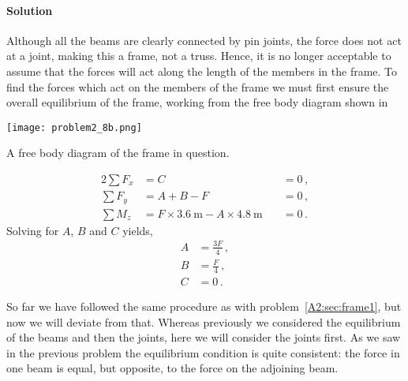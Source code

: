 \documentclass[a4paper,justified,oneside]{tufte-handout}
\numberwithin{equation}{subsection}
\begin{document}
\begin{solution}
\paragraph{Solution}
Although all the beams are clearly connected by pin joints, the force does not act at a joint, making this a frame, not a truss. Hence, it is no longer acceptable to assume that the forces will act along the length of the members in the frame. To find the forces which act on the members of the frame we must first ensure the overall equilibrium of the frame, working from the free body diagram shown in 
\begin{marginfigure}
	\centering
	\texttt{[image: problem2\_8b.png]}
	\caption{A free body diagram of the frame in question.}
	\label{A3:fig:Q8b}
\end{marginfigure}
\begin{alignat*}{2}
	\sum F_x	&=	C	&\quad=	0\,,	\\
	\sum F_y	&=	A +B -F	&\quad=	0\,,	\\
	\sum M_z		&=	F \times \SI{3.6}{\m}	-A\times \SI{4.8}{\m}	&\quad=	0\,.
\end{alignat*}
Solving for $A$, $B$ and $C$ yields,
\begin{align*}
A	&=	\frac{3F}{4}	\,,	\\
B	&=	\frac{F}{4}		\,,	\\
C	&=	0	\,.
\end{align*}

So far we have followed the same procedure as with problem~\ref{A2:sec:frame1}, but now we will deviate from that. Whereas previously we considered the equilibrium of the beams and then the joints, here we will consider the joints first. As we saw in the previous problem the equilibrium condition is quite consistent: the force in one beam is equal, but opposite, to the force on the adjoining beam.


\end{solution}
\end{document}
